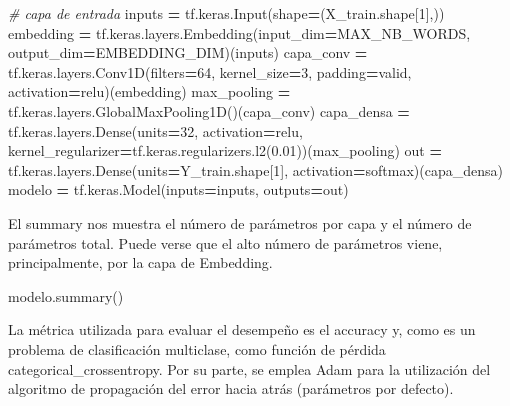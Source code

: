 \documentclass[
  a4paper,
  DIV=11,
  numbers=noendperiod]{scrreprt}
\newenvironment{Shaded}{\begin{snugshade}}{\end{snugshade}}
\newcommand{\CommentTok}[1]{\textcolor[rgb]{0.56,0.35,0.01}{\textit{#1}}}
\newcommand{\DecValTok}[1]{\textcolor[rgb]{0.00,0.00,0.81}{#1}}
\newcommand{\FloatTok}[1]{\textcolor[rgb]{0.00,0.00,0.81}{#1}}
\newcommand{\NormalTok}[1]{#1}
\newcommand{\OperatorTok}[1]{\textcolor[rgb]{0.81,0.36,0.00}{\textbf{#1}}}
\newcommand{\StringTok}[1]{\textcolor[rgb]{0.31,0.60,0.02}{#1}}
\begin{document}
\begin{Shaded}
\begin{Highlighting}[numbers=left,,]
\CommentTok{\# capa de entrada}
\NormalTok{inputs }\OperatorTok{=}\NormalTok{ tf.keras.Input(shape}\OperatorTok{=}\NormalTok{(X\_train.shape[}\DecValTok{1}\NormalTok{],))}
\NormalTok{embedding }\OperatorTok{=}\NormalTok{ tf.keras.layers.Embedding(input\_dim}\OperatorTok{=}\NormalTok{MAX\_NB\_WORDS,}
\NormalTok{output\_dim}\OperatorTok{=}\NormalTok{EMBEDDING\_DIM)(inputs)}
\NormalTok{capa\_conv }\OperatorTok{=}\NormalTok{ tf.keras.layers.Conv1D(filters}\OperatorTok{=}\DecValTok{64}\NormalTok{,}
\NormalTok{kernel\_size}\OperatorTok{=}\DecValTok{3}\NormalTok{,}
\NormalTok{padding}\OperatorTok{=}\StringTok{\textquotesingle{}valid\textquotesingle{}}\NormalTok{,}
\NormalTok{activation}\OperatorTok{=}\StringTok{\textquotesingle{}relu\textquotesingle{}}\NormalTok{)(embedding)}
\NormalTok{max\_pooling }\OperatorTok{=}\NormalTok{ tf.keras.layers.GlobalMaxPooling1D()(capa\_conv)}
\NormalTok{capa\_densa }\OperatorTok{=}\NormalTok{ tf.keras.layers.Dense(units}\OperatorTok{=}\DecValTok{32}\NormalTok{,}
\NormalTok{activation}\OperatorTok{=}\StringTok{\textquotesingle{}relu\textquotesingle{}}\NormalTok{,}
\NormalTok{kernel\_regularizer}\OperatorTok{=}\NormalTok{tf.keras.regularizers.l2(}\FloatTok{0.01}\NormalTok{))(max\_pooling)}
\NormalTok{out }\OperatorTok{=}\NormalTok{ tf.keras.layers.Dense(units}\OperatorTok{=}\NormalTok{Y\_train.shape[}\DecValTok{1}\NormalTok{],}
\NormalTok{activation}\OperatorTok{=}\StringTok{\textquotesingle{}softmax\textquotesingle{}}\NormalTok{)(capa\_densa)}
\NormalTok{modelo }\OperatorTok{=}\NormalTok{ tf.keras.Model(inputs}\OperatorTok{=}\NormalTok{inputs, outputs}\OperatorTok{=}\NormalTok{out)}
\end{Highlighting}
\end{Shaded}

El summary nos muestra el número de parámetros por capa y el número de
parámetros total. Puede verse que el alto número de parámetros viene,
principalmente, por la capa de Embedding.

\begin{Shaded}
\begin{Highlighting}[numbers=left,,]
\NormalTok{modelo.summary()}
\end{Highlighting}
\end{Shaded}

La métrica utilizada para evaluar el desempeño es el accuracy y, como es
un problema de clasificación multiclase, como función de pérdida
categorical\_crossentropy. Por su parte, se emplea Adam para la
utilización del algoritmo de propagación del error hacia atrás
(parámetros por defecto).
\end{document}
